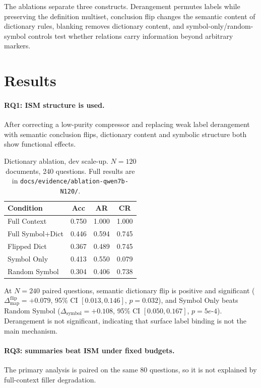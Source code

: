 \documentclass[10pt,twocolumn]{article}
\newcommand{\ism}{\textsc{ISM}}
\newcommand{\ar}{\textsc{AR}}
\newcommand{\cratio}{\textsc{CR}}
\begin{document}
The ablations separate three constructs.  Derangement permutes labels while
preserving the definition multiset, conclusion flip changes the semantic
content of dictionary rules, blanking removes dictionary content, and
symbol-only/random-symbol controls test whether relations carry information
beyond arbitrary markers.

\section{Results}

\paragraph{RQ1: \ism{} structure is used.}
After correcting a low-purity compressor and replacing weak label derangement
with semantic conclusion flips, dictionary content and symbolic structure both
show functional effects.

\begin{table}[t]
\centering
\scriptsize
\begin{tabular}{lccc}
\toprule
Condition & Acc & \ar & \cratio \\
\midrule
Full Context & 0.750 & 1.000 & 1.000 \\
Full Symbol+Dict & 0.446 & 0.594 & 0.745 \\
Flipped Dict & 0.367 & 0.489 & 0.745 \\
Symbol Only & 0.413 & 0.550 & 0.079 \\
Random Symbol & 0.304 & 0.406 & 0.738 \\
\bottomrule
\end{tabular}
\caption{Dictionary ablation, dev scale-up.  $N=120$ documents, 240 questions.
Full results are in \texttt{docs/evidence/ablation-qwen7b-N120/}.}
\label{tab:rq1}
\end{table}

At $N=240$ paired questions, semantic dictionary flip is positive and
significant ($\Delta_{\mathrm{map}}^{\mathrm{flip}}=+0.079$, 95\% CI
$[0.013,0.146]$, $p=0.032$), and Symbol Only beats Random Symbol
($\Delta_{\mathrm{symbol}}=+0.108$, 95\% CI $[0.050,0.167]$, $p=5e$-$4$).
Derangement is not significant, indicating that surface label binding is not
the main mechanism.

\paragraph{RQ3: summaries beat \ism{} under fixed budgets.}
The primary analysis is paired on the same 80 questions, so it is not explained
by full-context filler degradation.
\end{document}
